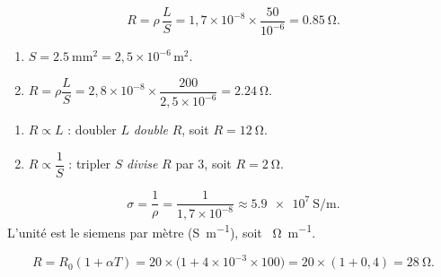 \documentclass[11pt,a4paper]{article}
\begin{document}
\usetikzlibrary{babel}
\begin{corrige}
\[ R=\rho\,\frac{L}{S}=1{,}7\times10^{-8}\times\frac{50}{10^{-6}}=\qty{0.85}{\ohm}. \]
\end{corrige}

\begin{corrige}
\begin{enumerate}[label=\alph*)]
  \item $S=\qty{2.5}{\milli\metre\squared}=2{,}5\times10^{-6}\,\si{\metre\squared}$.
  \item $R=\rho\dfrac{L}{S}=2{,}8\times10^{-8}\times\dfrac{200}{2{,}5\times10^{-6}}=\qty{2.24}{\ohm}$.
\end{enumerate}
\end{corrige}

\begin{corrige}[proportionnalités]
\begin{enumerate}[label=\alph*)]
  \item $R\propto L$ : doubler $L$ \emph{double} $R$, soit $R=\qty{12}{\ohm}$.
  \item $R\propto\dfrac{1}{S}$ : tripler $S$ \emph{divise} $R$ par $3$, soit $R=\qty{2}{\ohm}$.
\end{enumerate}
\end{corrige}

\begin{corrige}[conductivité]
\[ \sigma=\frac{1}{\rho}=\frac{1}{1{,}7\times10^{-8}}\approx\qty{5.9e7}{\siemens\per\metre}. \]
L'unité est le siemens par mètre (\si{\siemens\per\metre}), soit \si{\per\ohm\per\metre}.
\end{corrige}

\begin{corrige}
\[ R=R_0(1+\alpha T)=20\times\bigl(1+4\times10^{-3}\times100\bigr)=20\times(1+0{,}4)=\qty{28}{\ohm}. \]
\end{corrige}
\end{document}
